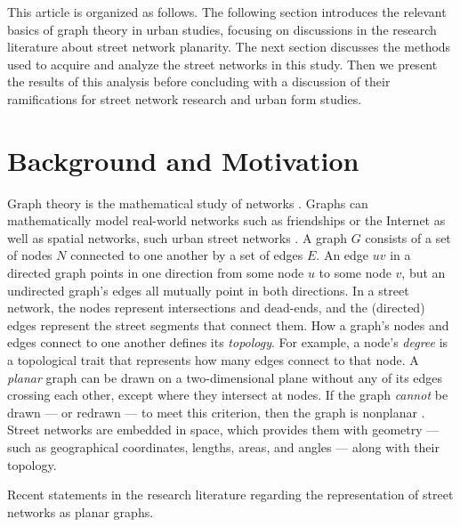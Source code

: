 \documentclass[Afour,sageh,times]{sagej}
\begin{document}
This article is organized as follows. The following section introduces the relevant basics of graph theory in urban studies, focusing on discussions in the research literature about street network planarity. The next section discusses the methods used to acquire and analyze the street networks in this study. Then we present the results of this analysis before concluding with a discussion of their ramifications for street network research and urban form studies.


\section{Background and Motivation}

Graph theory is the mathematical study of networks \citep{newman_networks:_2010}. Graphs can mathematically model real-world networks such as friendships or the Internet as well as spatial networks, such urban street networks \citep{barthelemy_spatial_2011}. A graph $G$ consists of a set of nodes $N$ connected to one another by a set of edges $E$. An edge $uv$ in a directed graph points in one direction from some node $u$ to some node $v$, but an undirected graph's edges all mutually point in both directions. In a street network, the nodes represent intersections and dead-ends, and the (directed) edges represent the street segments that connect them. How a graph's nodes and edges connect to one another defines its \emph{topology}. For example, a node's \emph{degree} is a topological trait that represents how many edges connect to that node. A \emph{planar} graph can be drawn on a two-dimensional plane without any of its edges crossing each other, except where they intersect at nodes. If the graph \emph{cannot} be drawn --- or redrawn --- to meet this criterion, then the graph is nonplanar \citep{trudeau_introduction_1994}. Street networks are embedded in space, which provides them with geometry --- such as geographical coordinates, lengths, areas, and angles --- along with their topology.

\begin{table}[htbp]
\centering
\caption{Recent statements in the research literature regarding the representation of street networks as planar graphs.}
\label{tab:planar_quotes}

\end{table}
\end{document}
